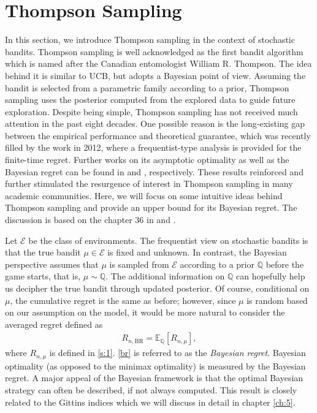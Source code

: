 \documentclass[letterpaper,11pt,openright,openany]{book}
\numberwithin{equation}{section}
\theoremstyle{plain}
\theoremstyle{definition}
\def\Q{{\mathbb Q}}
\def\E{{\mathbb E}}
\def\BR{{\text{BR}}}
\begin{document}
\section{Thompson Sampling}

In this section, we introduce Thompson sampling in the context of stochastic bandits. Thompson sampling \cite{Thompson_1933} is well acknowledged as the first bandit algorithm which is named after the Canadian entomologist William R. Thompson. 
The idea behind it is similar to UCB, but adopts a Bayesian point of view. Assuming the bandit is selected from a parametric family according to a prior, Thompson sampling uses the posterior computed from the explored data to guide future exploration. 
Despite being simple, Thompson sampling has not received much attention in the past eight decades. One possible reason is the long-existing gap between the empirical performance and theoretical guarantee, which was recently filled by the work \cite{agrawal2012analysis} in 2012, where a frequentist-type analysis is provided for the finite-time regret.  Further works on its asymptotic optimality as well as the Bayesian regret can be found in \cite{Kaufmann_2012} and \cite{Russo_2014}, respectively. These results reinforced and further stimulated the resurgence of interest in Thompson sampling in many academic communities. Here, we will focus on some intuitive ideas behind Thompson sampling and provide an upper bound for its Bayesian regret. The discussion is based on the chapter 36 in \cite{lattimore2018bandit} and \cite{Russo_2014}. 

Let $\mathcal E$ be the class of environments. The frequentist view on stochastic bandits is that the true bandit $\mu\in\mathcal E$ is fixed and unknown. In contrast, the Bayesian perspective assumes that $\mu$ is sampled from $\mathcal E$ according to a prior $\Q$ before the game starts, that is, $\mu\sim\Q$. The additional information on $\Q$ can hopefully help us decipher the true bandit through updated posterior. Of course, conditional on $\mu$, the cumulative regret is the same as before; however, since $\mu$ is random based on our assumption on the model, it would be more natural to consider the averaged regret defined as
\begin{align}
R_{n, \BR}=\E_\Q[R_{n,\mu}],\label{br}
\end{align}
where $R_{n,\mu}$ is defined in \eqref{s:1}. \eqref{br} is referred to as the \emph{Bayesian regret}. Bayesian optimality (as opposed to the minimax optimality) is measured by the Bayesian regret. A major appeal of the Bayesian framework is that the optimal Bayesian strategy can often be described, if not always computed. This result is closely related to the Gittins indices which we will discuss in detail in chapter \ref{ch:5}.
\end{document}
